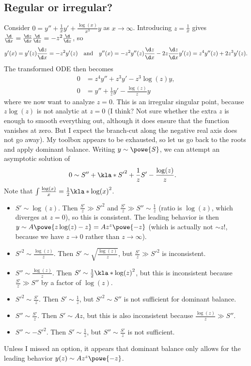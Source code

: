 \documentclass[english, parskip=full]{scrartcl}
\begin{document}
\subsection{Regular or irregular?}
Consider $0 = y'' + \frac{1}{x}y' + \frac{\log (x)}{x^3} y$ as $x\rightarrow\infty$.
Introducing $z=\frac{1}{x}$ gives $\frac{\d}{\d x} = \frac{\d z}{\d x} \frac{\d }{\d z} = -z^2 \frac{\d}{\d z}$, so
\begin{align}
y'(x) = y'(z) \frac{\d z}{\d x} = -z^2 y'(z) \quad\text{and}\quad y''(x) = -z^2 y''(z) \frac{\d z}{\d x} - 2z \frac{\d z}{\d x} y'(z) = z^4 y''(z) + 2z^3 y'(z).
\end{align}
The transformed ODE then becomes
\begin{align}
0 &= z^4 y'' + z^3 y' - z^3 \log(z) y,\\
0 &= y'' + \frac{1}{z} y' - \frac{\log(z)}{z} y
\end{align}
where we now want to analyze $z=0$.
This is an irregular singular point, because $z\log(z)$ is not analytic at $z=0$ (I think? Not sure whether the extra $z$ is enough to smooth everything out, although it does ensure that the function vanishes at zero. But I expect the branch-cut along the negative real axis does not go away).
My toolbox appears to be exhausted, so let us go back to the roots and apply dominant balance.
Writing $y\sim\powe{S}$, we can attempt an asymptotic solution of
\begin{align}
0 &\sim S'' + \kla*{S'}^2 + \frac{1}{z} S' - \frac{\log(z)}{z}.
\end{align}
Note that $\int\frac{\log(x)}{x} = \frac{1}{2} \kla*{\log (x)}^2$.
\begin{itemize}
\item $S' \sim \log(z)$. Then $\frac{S'}{z} \gg S'^2$ and $\frac{S'}{z} \gg S''\sim \frac{1}{z}$ (ratio is $\log(z)$, which diverges at $z=0$), so this is consistent.
The leading behavior is then $y\sim A\powe{z\log(z)-z} = Az^z \powe{-z}$ (which is actually not $\sim z!$, because we have $z\rightarrow 0$ rather than $z\rightarrow\infty$).
\item $S'^2 \sim \frac{\log(z)}{z}$. Then $S' \sim \sqrt{\frac{\log(z)}{z}}$, but $\frac{S'}{z} \gg S'^2$ is inconsistent.
\item $S''\sim \frac{\log(z)}{z}$. Then $S' \sim \frac{1}{2} \kla*{\log(z)}^2$, but this is inconsistent because $\frac{S'}{z} \gg S''$ by a factor of $\log(z)$.
\item $S'^2 \sim \frac{S'}{z}$. Then $S'\sim \frac{1}{z}$, but $S'^2 \sim S''$ is not sufficient for dominant balance.
\item $S'' \sim \frac{S'}{z}$. Then $S' \sim Az$, but this is also inconsistent because $\frac{\log(z)}{z} \gg S''$.
\item $S''\sim -S'^2$. Then $S' \sim \frac{1}{z}$, but $S'' \sim \frac{S'}{z}$ is not sufficient.
\end{itemize}
Unless I missed an option, it appears that dominant balance only allows for the leading behavior $y(z) \sim Az^z\powe{-z}$.
\end{document}
